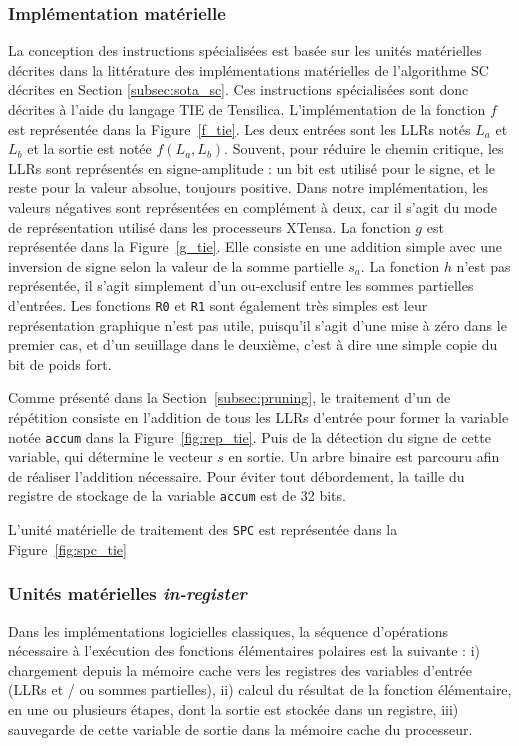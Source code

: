 \subsubsection{Implémentation matérielle}
La conception des instructions spécialisées est basée sur les unités matérielles décrites dans la littérature des implémentations matérielles de l'algorithme SC décrites en Section \ref{subsec:sota_sc}. Ces instructions spécialisées sont donc décrites à l'aide du langage TIE de Tensilica.
L'implémentation de la fonction $f$ est représentée dans la Figure~\ref{f_tie}. Les deux entrées sont les LLRs notés $L_a$ et $L_b$ et la sortie est notée $f(L_a,L_b)$. Souvent, pour réduire le chemin critique, les LLRs sont représentés en \og signe-amplitude \fg : un bit est utilisé pour le signe, et le reste pour la valeur absolue, toujours positive. Dans notre implémentation, les valeurs négatives sont représentées en complément à deux, car il s'agit du mode de représentation utilisé dans les processeurs XTensa.
La fonction $g$ est représentée dans la Figure~\ref{g_tie}. Elle consiste en une addition simple avec une inversion de signe selon la valeur de la somme partielle $s_a$.
La fonction $h$ n'est pas représentée, il s'agit simplement d'un ou-exclusif entre les sommes partielles d'entrées. Les fonctions \texttt{R0} et \texttt{R1} sont également très simples est leur représentation graphique n'est pas utile, puisqu'il s'agit d'une mise à zéro dans le premier cas, et d'un seuillage dans le deuxième, c'est à dire une simple copie du bit de poids fort.

Comme présenté dans la Section~\ref{subsec:pruning}, le traitement d'un \noeud de répétition consiste en l'addition de tous les LLRs d'entrée pour former la variable notée \og \texttt{accum} \fg dans la Figure~\ref{fig:rep_tie}. Puis de la détection du signe de cette variable, qui détermine le vecteur $s$ en sortie. Un arbre binaire est parcouru afin de réaliser l'addition nécessaire. Pour éviter tout débordement, la taille du registre de stockage de la variable \texttt{accum} est de 32 bits.

L'unité matérielle de traitement des \noeuds \texttt{SPC} est représentée dans la Figure~\ref{fig:spc_tie}

\subsubsection{Unités matérielles \textit{in-register}}

Dans les implémentations logicielles classiques, la séquence d'opérations nécessaire à l'exécution des fonctions élémentaires polaires est la suivante : i) chargement depuis la mémoire cache vers les registres des variables d'entrée (LLRs et / ou sommes partielles), ii) calcul du résultat de la fonction élémentaire, en une ou plusieurs étapes, dont la sortie est stockée dans un registre, iii) sauvegarde de cette variable de sortie dans la mémoire cache du processeur.

